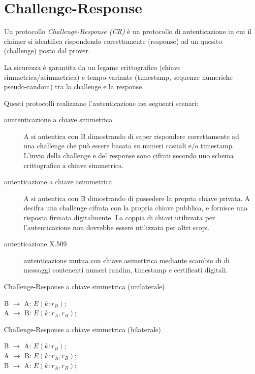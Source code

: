 \section{Challenge-Response}
Un protocollo \textit{Challenge-Response (CR)} è un protocollo di autenticazione in cui il claimer si identifica rispondendo correttamente (response) ad un quesito (challenge) posto dal prover.

La sicurezza è garantita da un legame crittografico (chiave simmetrica/asimmetrica) e tempo-variante (timestamp, sequenze numeriche pseudo-random) tra la challenge e la response.

Questi protocolli realizzano l'autenticazione nei seguenti scenari:

\begin{description}
  \item[auntenticazione a chiave simmetrica] A si autentica con B dimostrando di saper rispondere correttamente ad una challenge che può essere basata su numeri casuali e/o timestamp. L'invio della challenge e del response sono cifrati secondo uno schema crittografico a chiave simmetrica.

  \item[autenticazione a chiave asimmetrica] A si autentica con B dimostrando di possedere la propria chiave privata. A decifra una challenge cifrata con la propria chiave pubblica, e fornisce una risposta firmata digitalmente.
  La coppia di chiavi utilizzata per l'autenticazione non dovrebbe essere utilizzata per altri scopi.

  \item[autenticazione X.509] autenticazione mutua con chiave asimettrica mediante scambio di di messaggi contenenti numeri randim, timestamp e certificati digitali.
\end{description}

\bigskip
\begin{algorithm}[H]
  \caption{Challenge-Response a chiave simmetrica (unilaterale)}
  \label{alg:authentication-challenge-response-unilateral-symmetric}
  \SetAlgoNoLine
  B $\rightarrow$ A: $E(k:r_{B})$;\\
  A $\rightarrow$ B: $E(k:r_{A},r_{B})$;\\
\end{algorithm}

\bigskip
\begin{algorithm}[H]
  \caption{Challenge-Response a chiave simmetrica (bilaterale)}
  \label{alg:authentication-challenge-response-bilateral-symmetric}
  \SetAlgoNoLine
  B $\rightarrow$ A: $E(k:r_{B})$;\\
  A $\rightarrow$ B: $E(k:r_{A},r_{B})$;\\
  B $\rightarrow$ A: $E(k:r_{A},r_{B})$;\\
\end{algorithm}

